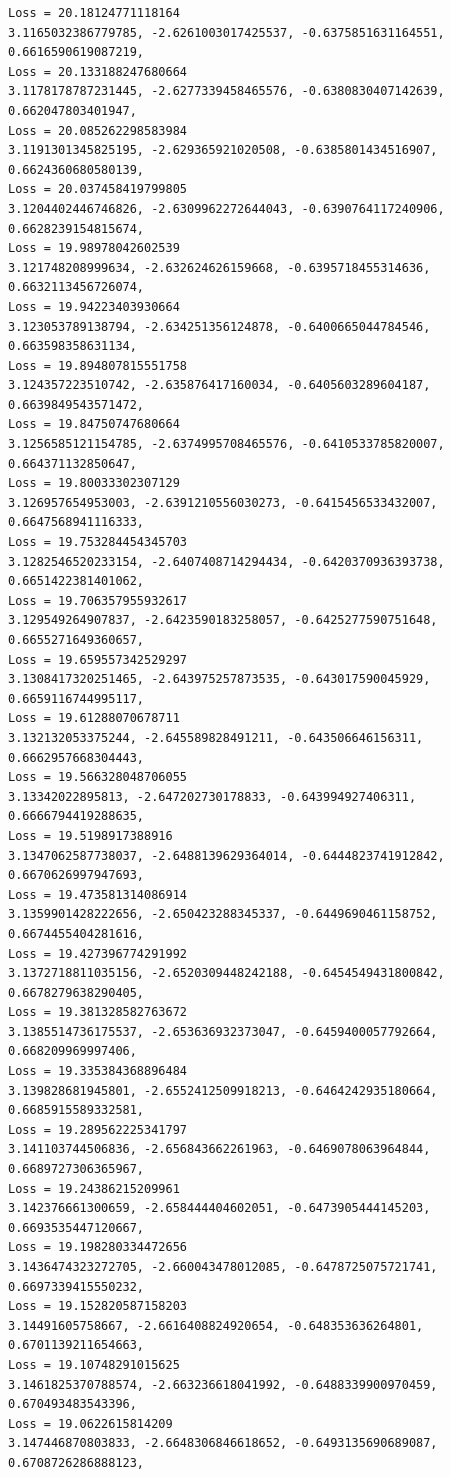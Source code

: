 \documentclass[11pt]{article}
\begin{document}
\begin{Verbatim}[commandchars=\\\{\}]
Loss = 20.18124771118164
3.1165032386779785, -2.6261003017425537, -0.6375851631164551,
0.6616590619087219,
Loss = 20.133188247680664
3.1178178787231445, -2.6277339458465576, -0.6380830407142639, 0.662047803401947,
Loss = 20.085262298583984
3.1191301345825195, -2.629365921020508, -0.6385801434516907, 0.6624360680580139,
Loss = 20.037458419799805
3.1204402446746826, -2.6309962272644043, -0.6390764117240906,
0.6628239154815674,
Loss = 19.98978042602539
3.121748208999634, -2.632624626159668, -0.6395718455314636, 0.6632113456726074,
Loss = 19.94223403930664
3.123053789138794, -2.634251356124878, -0.6400665044784546, 0.663598358631134,
Loss = 19.894807815551758
3.124357223510742, -2.635876417160034, -0.6405603289604187, 0.6639849543571472,
Loss = 19.84750747680664
3.1256585121154785, -2.6374995708465576, -0.6410533785820007, 0.664371132850647,
Loss = 19.80033302307129
3.126957654953003, -2.6391210556030273, -0.6415456533432007, 0.6647568941116333,
Loss = 19.753284454345703
3.1282546520233154, -2.6407408714294434, -0.6420370936393738,
0.6651422381401062,
Loss = 19.706357955932617
3.129549264907837, -2.6423590183258057, -0.6425277590751648, 0.6655271649360657,
Loss = 19.659557342529297
3.1308417320251465, -2.643975257873535, -0.643017590045929, 0.6659116744995117,
Loss = 19.61288070678711
3.132132053375244, -2.645589828491211, -0.643506646156311, 0.6662957668304443,
Loss = 19.566328048706055
3.13342022895813, -2.647202730178833, -0.643994927406311, 0.6666794419288635,
Loss = 19.5198917388916
3.1347062587738037, -2.6488139629364014, -0.6444823741912842,
0.6670626997947693,
Loss = 19.473581314086914
3.1359901428222656, -2.650423288345337, -0.6449690461158752, 0.6674455404281616,
Loss = 19.427396774291992
3.1372718811035156, -2.6520309448242188, -0.6454549431800842,
0.6678279638290405,
Loss = 19.381328582763672
3.1385514736175537, -2.653636932373047, -0.6459400057792664, 0.668209969997406,
Loss = 19.335384368896484
3.139828681945801, -2.6552412509918213, -0.6464242935180664, 0.6685915589332581,
Loss = 19.289562225341797
3.141103744506836, -2.656843662261963, -0.6469078063964844, 0.6689727306365967,
Loss = 19.24386215209961
3.142376661300659, -2.658444404602051, -0.6473905444145203, 0.6693535447120667,
Loss = 19.198280334472656
3.1436474323272705, -2.660043478012085, -0.6478725075721741, 0.6697339415550232,
Loss = 19.152820587158203
3.14491605758667, -2.6616408824920654, -0.648353636264801, 0.6701139211654663,
Loss = 19.10748291015625
3.1461825370788574, -2.663236618041992, -0.6488339900970459, 0.670493483543396,
Loss = 19.0622615814209
3.147446870803833, -2.6648306846618652, -0.6493135690689087, 0.6708726286888123,

\end{Verbatim}
\end{document}
